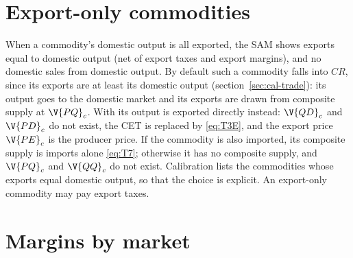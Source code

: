 \section{Export-only commodities}\label{sec:exportonly}

When a commodity's domestic output is all exported, the SAM shows exports
equal to domestic output (net of export taxes and export margins), and no
domestic sales from domestic output. By default such a commodity falls into
$CR$, since its exports are at least its domestic output
(section~\ref{sec:cal-trade}): its output goes to the domestic market and its
exports are drawn from composite supply at $\V{PQ}_c$. With
 its output is exported directly instead:
$\V{QD}_c$ and $\V{PD}_c$ do not exist, the CET is replaced by \eqref{eq:T3E},
and the export price $\V{PE}_c$ is the producer price. If the commodity is also
imported, its composite supply is imports alone \eqref{eq:T7}; otherwise it
has no composite supply, and $\V{PQ}_c$ and $\V{QQ}_c$ do not exist.
Calibration lists the commodities whose exports equal domestic output, so that
the choice is explicit. An export-only commodity may pay export taxes.

\section{Margins by market}\label{sec:margins-market}

